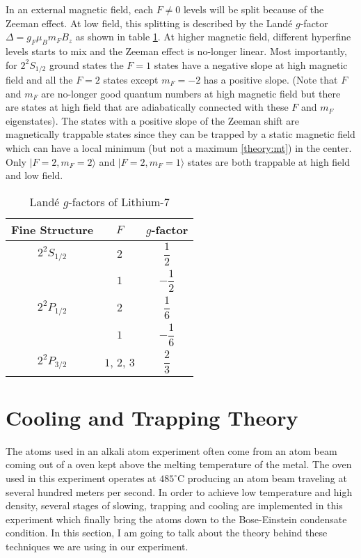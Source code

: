 In an external magnetic field, each $F\neq0$ levels will be split because of the Zeeman effect. At low field, this splitting is described by the Land\'e $g$-factor $\Delta=g_F\mu_Bm_FB_z$ as shown in table \ref{li7:g-factors}. At higher magnetic field, different hyperfine levels starts to mix and the Zeeman effect is no-longer linear. Most importantly, for $2^2S_{1/2}$ ground states the $F=1$ states have a negative slope at high magnetic field and all the $F=2$ states except $m_F=-2$ has a positive slope. (Note that $F$ and $m_F$ are no-longer good quantum numbers at high magnetic field but there are states at high field that are adiabatically connected with these $F$ and $m_F$ eigenstates). The states with a positive slope of the Zeeman shift are magnetically trappable states since they can be trapped by a static magnetic field which can have a local minimum (but not a maximum \ref{theory:mt}) in the center. Only $|F=2, m_F=2\rangle$ and $|F=2, m_F=1\rangle$ states are both trappable at high field and low field.

\begin{table}
  \caption{Land\'e $g$-factors of Lithium-$7$}
  \label{li7:g-factors}
  \begin{center}
    \begin{tabular}{|c|c|c|}\hline
      Fine Structure & $F$ & $g$-factor \\\hline
      $2^2S_{1/2}$ & $2$ & $\dfrac 12$ \\\cline{2-3}
      & $1$ & $-\dfrac 12$ \\\hline
      $2^2P_{1/2}$ & $2$ & $\dfrac 16$ \\\cline{2-3}
      & $1$ & $-\dfrac 16$ \\\hline
      $2^2P_{3/2}$ & $1$, $2$, $3$ & $\dfrac 23$ \\\hline
    \end{tabular}
  \end{center}
\end{table}

\section{Cooling and Trapping Theory}

The atoms used in an alkali atom experiment often come from an atom beam coming out of a oven kept above the melting temperature of the metal. The oven used in this experiment operates at $485^\circ\text{C}$ producing an atom beam traveling at several hundred meters per second. In order to achieve low temperature and high density, several stages of slowing, trapping and cooling are implemented in this experiment which finally bring the atoms down to the Bose-Einstein condensate condition. In this section, I am going to talk about the theory behind these techniques we are using in our experiment.

